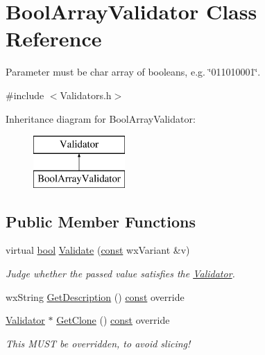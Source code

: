 \hypertarget{class_bool_array_validator}{}\section{Bool\+Array\+Validator Class Reference}
\label{class_bool_array_validator}


Parameter must be char array of booleans, e.\+g. \char`\"{}011010001\char`\"{}.  




{\ttfamily \#include $<$Validators.\+h$>$}

Inheritance diagram for Bool\+Array\+Validator\+:\begin{figure}[H]
\begin{center}
\leavevmode
\includegraphics[height=2.000000cm]{class_bool_array_validator}
\end{center}
\end{figure}
\subsection*{Public Member Functions}
\begin{DoxyCompactItemize}
\item 
virtual \hyperlink{mac_2config_2i386_2lib-src_2libsoxr_2soxr-config_8h_abb452686968e48b67397da5f97445f5b}{bool} \hyperlink{class_bool_array_validator_a5f834e5f051e56a97ef098d21182a6d6}{Validate} (\hyperlink{getopt1_8c_a2c212835823e3c54a8ab6d95c652660e}{const} wx\+Variant \&v)
\begin{DoxyCompactList}\small\item\em Judge whether the passed value satisfies the \hyperlink{class_validator}{Validator}. \end{DoxyCompactList}\item 
wx\+String \hyperlink{class_bool_array_validator_a2229e3e23b0e00df806df3d3665205ff}{Get\+Description} () \hyperlink{getopt1_8c_a2c212835823e3c54a8ab6d95c652660e}{const}  override
\item 
\hyperlink{class_validator}{Validator} $\ast$ \hyperlink{class_bool_array_validator_aa39ddb705752f826d187855bcf3d82fb}{Get\+Clone} () \hyperlink{getopt1_8c_a2c212835823e3c54a8ab6d95c652660e}{const}  override
\begin{DoxyCompactList}\small\item\em This M\+U\+ST be overridden, to avoid slicing! \end{DoxyCompactList}\end{DoxyCompactItemize}


